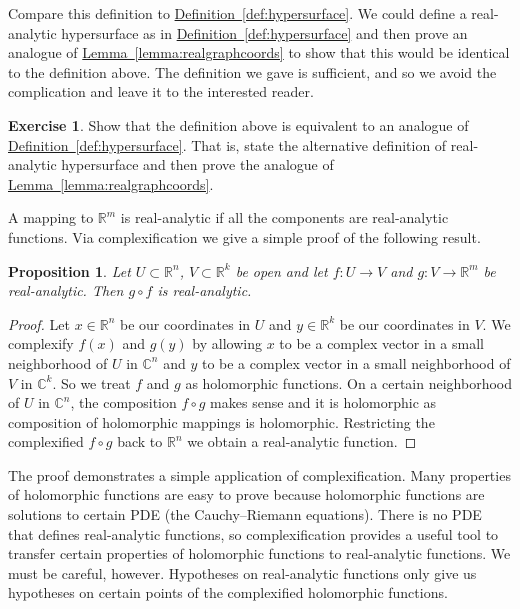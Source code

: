 \documentclass[12pt,openany]{book}
\newcommand{\C}{{\mathbb{C}}}
\newcommand{\R}{{\mathbb{R}}}
\theoremstyle{plain}
\newtheorem{prop}[thm]{Proposition}
\theoremstyle{remark}
\theoremstyle{definition}
\newenvironment{exbox}{%
    \def\FrameCommand{\vrule width 1pt \relax\hspace{10pt}}%
    \MakeFramed {\advance \hsize -\width \FrameRestore}%
}{%
    \endMakeFramed
}
\theoremstyle{exercise}
\newtheorem{exercise}{Exercise}[section]
\theoremstyle{example}
\newcommand{\lemmaref}[1]{\hyperref[#1]{Lemma~\ref*{#1}}}
\newcommand{\defnref}[1]{\hyperref[#1]{Definition~\ref*{#1}}}
\begin{document}
Compare this definition to \defnref{def:hypersurface}.  We could
define a real-analytic hypersurface as in 
\defnref{def:hypersurface} and then prove an analogue of
\lemmaref{lemma:realgraphcoords} to show that this would be identical to the
definition above.  The definition we gave is sufficient, and so we avoid
the complication and leave it to the interested reader.

\begin{exbox}
\begin{exercise}
Show that the definition above is equivalent to an analogue of
\defnref{def:hypersurface}.  That is, state the alternative definition of
real-analytic hypersurface and then prove the analogue of 
\lemmaref{lemma:realgraphcoords}.
\end{exercise}
\end{exbox}

A mapping to $\R^m$ is real-analytic if all the components are real-analytic
functions.  Via complexification we give a simple proof of the following
result.

\begin{prop}
Let $U \subset \R^n$, $V \subset \R^k$ be open and let
$f \colon U \to V$ and $g \colon V \to \R^m$ be real-analytic.
Then $g \circ f$ is real-analytic.
\end{prop}

\begin{proof}
Let $x \in \R^n$ be our coordinates in $U$ and $y \in \R^k$ be
our coordinates in $V$.  We complexify $f(x)$ and $g(y)$ by
allowing $x$ to be a complex vector in a small neighborhood of $U$ in
$\C^n$
and  $y$ to be a complex vector in a small neighborhood of $V$ in $\C^k$.
So we treat $f$ and $g$ as holomorphic functions.  On a certain
neighborhood of $U$ in $\C^n$, the composition $f \circ g$ makes sense
and it is holomorphic as composition of holomorphic mappings is holomorphic.
Restricting the complexified $f \circ g$ back to $\R^n$ we obtain a
real-analytic function.
\end{proof}

The proof demonstrates a simple application of complexification.  Many
properties of holomorphic functions are easy to prove because
holomorphic functions are solutions to certain PDE (the Cauchy--Riemann
equations).  There is no PDE
that defines real-analytic functions, so complexification provides a useful
tool to transfer certain properties of holomorphic functions to
real-analytic functions.  We must be careful, however.  Hypotheses on
real-analytic functions only give us hypotheses on certain points of the
complexified holomorphic functions.
\end{document}
